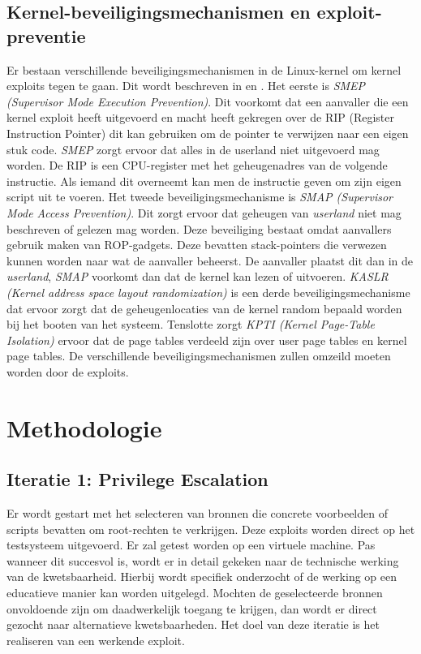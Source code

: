\subsection{Kernel-beveiligingsmechanismen en exploit-preventie}
Er bestaan verschillende beveiligingsmechanismen in de Linux-kernel om kernel exploits tegen te gaan. Dit wordt beschreven in \textcite{takaronis2024linux} en \textcite{LKMPwnPart1}. Het eerste is \emph{SMEP (Supervisor Mode Execution Prevention)}. Dit voorkomt dat een aanvaller die een kernel exploit heeft uitgevoerd en macht heeft gekregen over de RIP (Register Instruction Pointer) dit kan gebruiken om de pointer te verwijzen naar een eigen stuk code. \emph{SMEP} zorgt ervoor dat alles in de userland niet uitgevoerd mag worden. De RIP is een CPU-register met het geheugenadres van de volgende instructie. Als iemand dit overneemt kan men de instructie geven om zijn eigen script uit te voeren.
Het tweede beveiligingsmechanisme is \emph{SMAP (Supervisor Mode Access Prevention)}. Dit zorgt ervoor dat geheugen van \emph{userland} niet mag beschreven of gelezen mag worden. Deze beveiliging bestaat omdat aanvallers gebruik maken van  ROP-gadgets. Deze bevatten stack-pointers die verwezen kunnen worden naar wat de aanvaller beheerst. De aanvaller plaatst dit dan in de \emph{userland}, \emph{SMAP} voorkomt dan dat de kernel kan lezen of uitvoeren. 
\emph{KASLR (Kernel address space layout randomization)} is een derde beveiligingsmechanisme dat ervoor zorgt dat de geheugenlocaties van de kernel random bepaald worden bij het booten van het systeem. 
Tenslotte zorgt \emph{KPTI (Kernel Page-Table Isolation)} ervoor dat de page tables verdeeld zijn over user page tables en kernel page tables. De verschillende beveiligingsmechanismen zullen omzeild moeten worden door de exploits.  

\section{Methodologie}%
\label{sec:methodologie}

\subsection{Iteratie 1: Privilege Escalation}
Er wordt gestart met het selecteren van bronnen die concrete voorbeelden of scripts bevatten om root-rechten te verkrijgen. Deze exploits worden direct op het testsysteem uitgevoerd. Er zal getest worden op een virtuele machine. Pas wanneer dit succesvol is, wordt er in detail gekeken naar de technische werking van de kwetsbaarheid. Hierbij wordt specifiek onderzocht of de werking op een educatieve manier kan worden uitgelegd. Mochten de geselecteerde bronnen onvoldoende zijn om daadwerkelijk toegang te krijgen, dan wordt er direct gezocht naar alternatieve kwetsbaarheden. Het doel van deze iteratie is het realiseren van een werkende exploit. 


